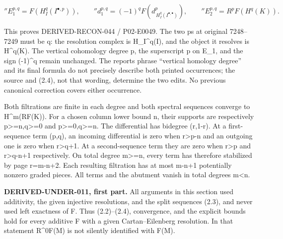 \[
 {}''E_1^{p,q}=F(H_I^q(I^{\bullet,p})),\qquad
 {}''d_1^{p,q}=(-1)^q F(d_{\,H_I^q(I^{\bullet,\bullet})}^{p}),
 \qquad
 {}''E_2^{p,q}=R^pF(H^q(K)).                                  \tag{2.4}
\]

This proves DERIVED-RECON-044 /\allowbreak{} P02-E0049. The two p\textquotesingle s at original 7248–\allowbreak{}7249 must be q:\allowbreak{} the resolution complex is H\_\allowbreak{}I\textasciicircum{}q(I)\allowbreak{},\allowbreak{} and the object it resolves is H\textasciicircum{}q(K)\allowbreak{}. The vertical cohomology degree p,\allowbreak{} the superscript p on E\_\allowbreak{}1,\allowbreak{} and the sign (-1)\allowbreak{}\textasciicircum{}q remain unchanged. The report\textquotesingle s phrase ``vertical homology degree'' and its final formula do not precisely describe both printed occurrences; the source and (2.4)\allowbreak{},\allowbreak{} not that wording,\allowbreak{} determine the two edits. No previous canonical correction covers either occurrence.

Both filtrations are finite in each degree and both spectral sequences converge to H\textasciicircum{}m(RF(K)\allowbreak{})\allowbreak{}. For a chosen column lower bound n,\allowbreak{} their supports are respectively p>\allowbreak{}=n,\allowbreak{}q>\allowbreak{}=0 and p>\allowbreak{}=0,\allowbreak{}q>\allowbreak{}=n. The differential has bidegree (r,\allowbreak{}1-r)\allowbreak{}. At a first-sequence term (p,\allowbreak{}q)\allowbreak{},\allowbreak{} an incoming differential is zero when r\textgreater p-n and an outgoing one is zero when r>q\allowbreak{}+1. At a second-sequence term they are zero when r\textgreater p and r>q-n\allowbreak{}+1 respectively. On total degree m>\allowbreak{}=n,\allowbreak{} every term has therefore stabilized by page r\allowbreak{}=m-n\allowbreak{}+2. Each resulting filtration has at most m-n\allowbreak{}+1 potentially nonzero graded pieces. All terms and the abutment vanish in total degrees m\textless n.

\textbf{DERIVED-UNDER-011,\allowbreak{} first part.} All arguments in this section used additivity,\allowbreak{} the given injective resolutions,\allowbreak{} and the split sequences (2.3)\allowbreak{},\allowbreak{} and never used left exactness of F. Thus (2.2)\allowbreak{}–\allowbreak{}(2.4)\allowbreak{},\allowbreak{} convergence,\allowbreak{} and the explicit bounds hold for every additive F with a given Cartan–\allowbreak{}Eilenberg resolution. In that statement R\textasciicircum{}0F(M)\allowbreak{} is not silently identified with F(M)\allowbreak{}.

